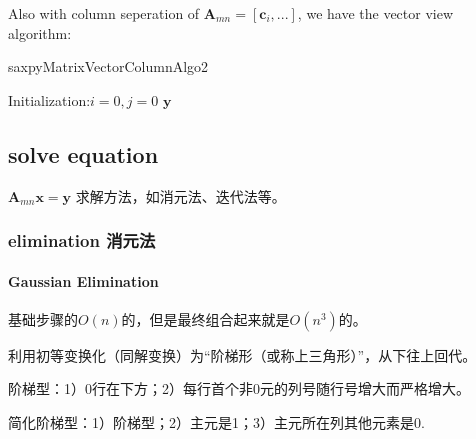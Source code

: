 \documentclass[UTF8]{../../09-Mathematics}
\begin{document}
Also with column seperation of $\boldsymbol A_{mn} = [\boldsymbol c_i, ...]$, we have the vector view algorithm:
\begin{algorithm}[H]
    \caption{saxpyMatrixVectorColumnAlgo2}\label{algo:saxpyMatrixVectorColumnAlgo2}
    \SetAlgoLined
    Initialization:$i=0,j=0$\;
    \KwRet $\boldsymbol y$\;
\end{algorithm}





\subsection{solve equation}

$\boldsymbol A_{mn} \boldsymbol x  =  \boldsymbol y$
求解方法，如消元法、迭代法等。

\subsubsection{elimination 消元法}


\paragraph{Gaussian Elimination}

基础步骤的$O(n)$的，但是最终组合起来就是$O(n^3)$的。


利用初等变换化（同解变换）为“阶梯形（或称上三角形）”，从下往上回代。

阶梯型：1）0行在下方；2）每行首个非0元的列号随行号增大而严格增大。

简化阶梯型：1）阶梯型；2）主元是1；3）主元所在列其他元素是0.
\end{document}
